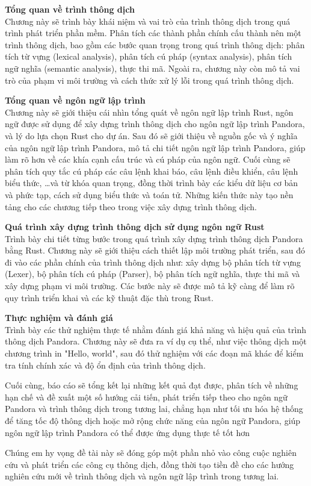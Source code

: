\begin{mucluc}
    
    \item {\bf{Tổng quan về trình thông dịch}}\\
    Chương này sẽ trình bày khái niệm và vai trò của trình thông dịch trong quá trình phát triển phần mềm. Phân tích các thành phần chính cấu thành nên một trình thông dịch, bao gồm các bước quan trọng trong quá trình thông dịch: phân tích từ vựng (lexical analysis), phân tích cú pháp (syntax analysis), phân tích ngữ nghĩa (semantic analysis), thực thi mã. Ngoài ra, chương này còn mô tả vai trò của phạm vi môi trường và cách thức xử lý lỗi trong quá trình thông dịch.
    \item {\bf{Tổng quan về ngôn ngữ lập trình}}\\
    Chương này sẽ giới thiệu cái nhìn tổng quát về ngôn ngữ lập trình Rust, ngôn ngữ được sử dụng để xây dựng trình thông dịch cho ngôn ngữ lập trình Pandora, và lý do lựa chọn Rust cho dự án. Sau đó sẽ giới thiệu về nguồn gốc và ý nghĩa của ngôn ngữ lập trình Pandora, mô tả chi tiết ngôn ngữ lập trình Pandora, giúp làm rõ hơn về các khía cạnh cấu trúc và cú pháp của ngôn ngữ. Cuối cùng sẽ phân tích quy tắc cú pháp các câu lệnh khai báo, câu lệnh điều khiển, câu lệnh biểu thức, \dots và từ khóa quan trọng, đồng thời trình bày các kiểu dữ liệu cơ bản và phức tạp, cách sử dụng biểu thức và toán tử. Những kiến thức này tạo nền tảng cho các chương tiếp theo trong việc xây dựng trình thông dịch.  
    \item {\bf{Quá trình xây dựng trình thông dịch sử dụng ngôn ngữ Rust}}\\
    Trình bày chi tiết từng bước trong quá trình xây dựng trình thông dịch Pandora bằng Rust. Chương này sẽ giới thiệu cách thiết lập môi trường phát triển, sau đó đi vào các phần chính của trình thông dịch như: xây dựng bộ phân tích từ vựng (Lexer), bộ phân tích cú pháp (Parser), bộ phân tích ngữ nghĩa, thực thi mã và xây dựng phạm vi môi trường. Các bước này sẽ được mô tả kỹ càng để làm rõ quy trình triển khai và các kỹ thuật đặc thù trong Rust.
    \item {\bf{Thực nghiệm và đánh giá}}\\
    Trình bày các thử nghiệm thực tế nhằm đánh giá khả năng và hiệu quả của trình thông dịch Pandora. Chương này sẽ đưa ra ví dụ cụ thể, như việc thông dịch một chương trình in "Hello, world", sau đó thử nghiệm với các đoạn mã khác để kiểm tra tính chính xác và độ ổn định của trình thông dịch.
\end{mucluc}

Cuối cùng, báo cáo sẽ tổng kết lại những kết quả đạt được, phân tích về những hạn chế và đề xuất một số hướng cải tiến, phát triển tiếp theo cho ngôn ngữ Pandora và trình thông dịch  trong tương lai, chẳng hạn như tối ưu hóa hệ thống để tăng tốc độ thông dịch hoặc mở rộng chức năng của ngôn ngữ Pandora, giúp ngôn ngữ lập trình Pandora có thể được ứng dụng thực tế tốt hơn

Chúng em hy vọng đề tài này sẽ đóng góp một phần nhỏ vào công cuộc nghiên cứu và phát triển các công cụ thông dịch, đồng thời tạo tiền đề cho các hướng nghiên cứu mới về trình thông dịch và ngôn ngữ lập trình trong tương lai.
